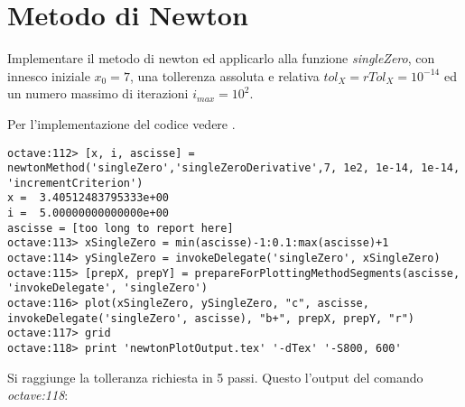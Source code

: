 \section{Metodo di Newton}
\label{sec:metodoDiNewton}

\begin{exercise}
Implementare il metodo di newton ed applicarlo alla funzione \emph{singleZero},
con innesco iniziale $x_{0} = 7$, una tollerenza assoluta e relativa
$tol_{X} = rTol_{X} = 10^{-14}$ ed un numero massimo di iterazioni
$i_{max} = 10^{2}$.
\end{exercise}
Per l'implementazione del codice vedere .
\begin{lstlisting}
octave:112> [x, i, ascisse] = newtonMethod('singleZero','singleZeroDerivative',7, 1e2, 1e-14, 1e-14, 'incrementCriterion') 
x =  3.40512483795333e+00
i =  5.00000000000000e+00
ascisse = [too long to report here]
octave:113> xSingleZero = min(ascisse)-1:0.1:max(ascisse)+1
octave:114> ySingleZero = invokeDelegate('singleZero', xSingleZero)
octave:115> [prepX, prepY] = prepareForPlottingMethodSegments(ascisse, 'invokeDelegate', 'singleZero')
octave:116> plot(xSingleZero, ySingleZero, "c", ascisse, invokeDelegate('singleZero', ascisse), "b+", prepX, prepY, "r")
octave:117> grid
octave:118> print 'newtonPlotOutput.tex' '-dTex' '-S800, 600'
\end{lstlisting}
Si raggiunge la tolleranza richiesta in 5 passi. Questo l'output del comando
\emph{octave:118}:
\begin{center}

\end{center}


